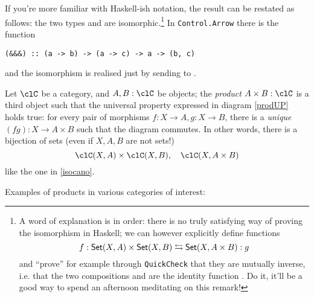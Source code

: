 \documentclass[11pt]{article}
\begin{document}
If you're more familiar with Haskell-ish notation, the result can be restated as follows: the two types  and  are isomorphic.\footnote{A word of explanation is in order: there is no truly satisfying way of proving the isomorphism in Haskell; we can however explicitly define functions
\[
	f : {\sf Set}(X, A)\times {\sf Set}(X,B)\leftrightarrows {\sf Set}(X, A\times B) : g
\]
and ``prove'' for example through \texttt{QuickCheck} that they are mutually inverse, i.e. that the two compositions  and  are the identity function . Do it, it'll be a good way to spend an afternoon meditating on this remark!} In \verb|Control.Arrow| there is the function
\begin{verbatim}
(&&&) :: (a -> b) -> (a -> c) -> a -> (b, c)
\end{verbatim}
and the isomorphism is realised just by sending  to .
\begin{definition}
	Let $\clC$ be a category, and $A,B : \clC$ be objects; the \emph{product} $A\times B : \clC$ is a third object such that the universal property expressed in diagram \eqref{prodUP} holds true: for every pair of morphisms $f : X \to A, g : X \to B$, there is a \emph{unique} $(fg) : X \to A\times B$ such that the diagram commutes. In other words, there is a bijection of sets (even if $X,A,B$ are not sets!)
	\[
		\clC(X, A)\times \clC(X,B),\quad \clC(X, A\times B)
	\]
	like the one in \eqref{isocano}.
\end{definition}
Examples of products in various categories of interest:
\end{document}
